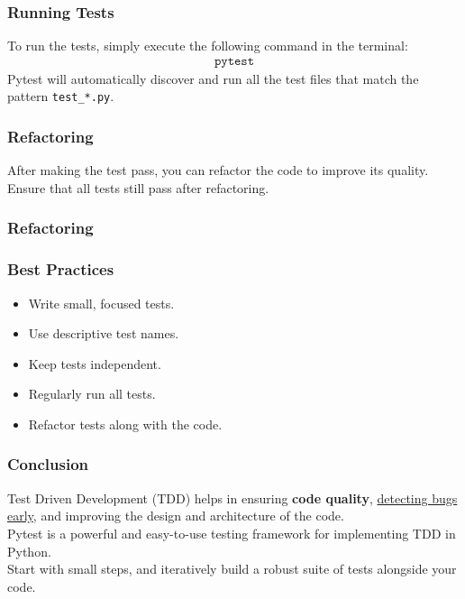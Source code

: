 \documentclass{beamer}
\begin{document}
\begin{frame}
  \frametitle{Running Tests}
  To run the tests, simply execute the following command in the terminal:
  \begin{align*}
  \texttt{pytest}
  \end{align*}
  Pytest will automatically discover and run all the test files that match the pattern \texttt{test\_*.py}.
\end{frame}

\begin{frame}
  \frametitle{Refactoring}
  After making the test pass, you can refactor the code to improve its quality. Ensure that all tests still pass after refactoring.
  
\end{frame}
\begin{frame}
  \frametitle{Refactoring}
  
\end{frame}
\begin{frame}
  \frametitle{Best Practices}
  \begin{itemize}
    \item Write small, focused tests.
    \item Use descriptive test names.
    \item Keep tests independent.
    \item Regularly run all tests.
    \item Refactor tests along with the code.
  \end{itemize}
\end{frame}

\begin{frame}
  \frametitle{Conclusion}
  Test Driven Development (TDD) helps in ensuring \textbf{code quality}, \underline{detecting bugs early}, and improving the design and architecture of the code.\\
  Pytest is a powerful and easy-to-use testing framework for implementing TDD in Python.\\
  Start with small steps, and iteratively build a robust suite of tests alongside your code.
\end{frame}
\end{document}
